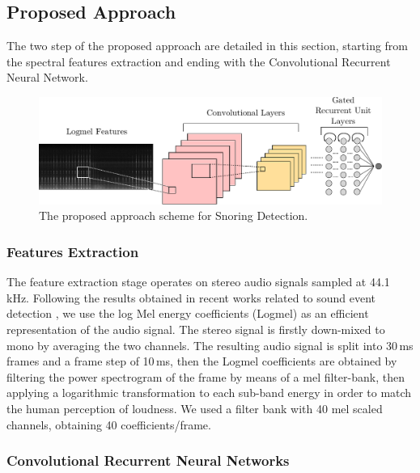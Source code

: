 \subsection{Proposed Approach}

The two step of the proposed approach are detailed in this section, starting from the spectral features extraction and ending with the Convolutional Recurrent Neural Network.

\begin{figure}[t]
	\centering
	\includegraphics[width=0.9\columnwidth]{img/snore_detection_4.pdf}
	\caption[Proposed approach for Snoring Detection]{The proposed approach scheme for Snoring Detection.}
	\label{fig:overall}
\end{figure}

\subsubsection{Features Extraction}
The feature extraction stage operates on stereo audio signals sampled at 44.1 kHz. 
Following the results obtained in recent works related to sound event detection \cite{DCASE2017Workshop}, we use the log Mel energy coefficients (Logmel) as an efficient representation of the audio signal. The stereo signal is firstly down-mixed to mono by averaging the two channels. 
The resulting audio signal is split into 30\,ms frames and a frame step of 10\,ms, then the Logmel coefficients are obtained by filtering the power spectrogram of the frame by means of a mel filter-bank, then applying a logarithmic  transformation to each sub-band energy in order to match the human perception of loudness. We used a filter bank with 40 mel scaled channels, obtaining 40 coefficients/frame. 

\subsubsection{Convolutional Recurrent Neural Networks}


